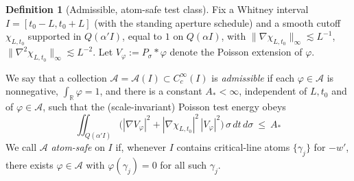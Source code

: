 \documentclass[11pt]{article}
\theoremstyle{definition}
\newtheorem{definition}{Definition}[section]
\theoremstyle{remark}
\newcommand{\R}{\mathbb{R}}
\begin{document}
\begin{definition}[Admissible, atom-safe test class]\label{def:admissible-class}
Fix a Whitney interval \(I=[t_0-L,t_0+L]\) (with the standing aperture schedule)
and a smooth cutoff \(\chi_{L,t_0}\) supported in \(Q(\alpha'I)\), equal to \(1\) on \(Q(\alpha I)\), with
\(\|\nabla\chi_{L,t_0}\|_\infty\lesssim L^{-1}\), \(\|\nabla^2\chi_{L,t_0}\|_\infty\lesssim L^{-2}\).
Let \(V_\varphi:=P_\sigma*\varphi\) denote the Poisson extension of \(\varphi\).


We say that a collection \(\mathcal A=\mathcal A(I)\subset C_c^\infty(I)\) is \emph{admissible}
if each \(\varphi\in\mathcal A\) is nonnegative, \(\int_{\R}\varphi=1\), and there is a constant \(A_\ast<\infty\),
independent of \(L,t_0\) and of \(\varphi\in\mathcal A\), such that the (scale-invariant) Poisson test energy obeys
\begin{equation}\label{eq:Poisson-energy-bound}
  \iint_{Q(\alpha'I)} \Big(|\nabla V_\varphi|^2 + |\nabla\chi_{L,t_0}|^2\,|V_\varphi|^2\Big)\,\sigma\,dt\,d\sigma
  \ \le\ A_\ast
\end{equation}
We call \(\mathcal A\) \emph{atom-safe} on \(I\) if, whenever \(I\) contains critical-line atoms \(\{\gamma_j\}\) for \(-w'\),
there exists \(\varphi\in\mathcal A\) with \(\varphi(\gamma_j)=0\) for all such \(\gamma_j\).
\end{definition}

















\vspace{1.0cm}
\end{document}
